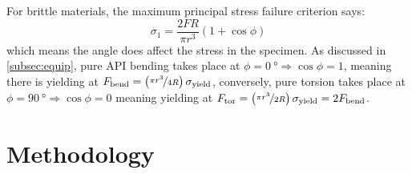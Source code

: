 \documentclass[authoryear]{tex/labreport}
\begin{document}
For brittle materials, the maximum principal stress failure criterion says:
\begin{equation}
    \sigma_1 = \frac{2FR}{\pi r^3}(1+\cos\phi) 
\end{equation}
which means the angle does affect the stress in the specimen. 
As discussed in \cref{subsec:equip}, pure \ac{API} bending takes place at $\phi = \SI{0}{\degree}\Rightarrow\cos\phi=1$, meaning there is yielding at $F_\text{bend}=\left(\nicefrac{\pi r^3}{4R}\right)\sigma_\text{yield}$, conversely, pure torsion  takes place at $\phi = \SI{90}{\degree}\Rightarrow\cos\phi=0$ meaning yielding at $F_\text{tor}=\left(\nicefrac{\pi r^3}{2R}\right)\sigma_\text{yield}=2F_\text{bend}$. 
\section{Methodology}
\label{sec:methods}
\end{document}

